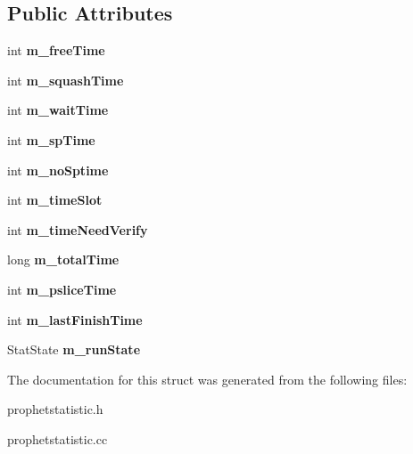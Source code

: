 \subsection*{Public Attributes}
\begin{DoxyCompactItemize}
\item 
\hypertarget{structProphetStat_1_1StatTime_ac676df9157635eaffc5bd02f654daee9}{
int {\bfseries m\_\-freeTime}}
\label{structProphetStat_1_1StatTime_ac676df9157635eaffc5bd02f654daee9}

\item 
\hypertarget{structProphetStat_1_1StatTime_aa3ec64ca05e740139b76184158169db0}{
int {\bfseries m\_\-squashTime}}
\label{structProphetStat_1_1StatTime_aa3ec64ca05e740139b76184158169db0}

\item 
\hypertarget{structProphetStat_1_1StatTime_ae7ddad00f7aaeb89b70c155a240ff2c9}{
int {\bfseries m\_\-waitTime}}
\label{structProphetStat_1_1StatTime_ae7ddad00f7aaeb89b70c155a240ff2c9}

\item 
\hypertarget{structProphetStat_1_1StatTime_a594256279592f8f1776ecb4191322657}{
int {\bfseries m\_\-spTime}}
\label{structProphetStat_1_1StatTime_a594256279592f8f1776ecb4191322657}

\item 
\hypertarget{structProphetStat_1_1StatTime_a930e8175516047464f9eb041173bd210}{
int {\bfseries m\_\-noSptime}}
\label{structProphetStat_1_1StatTime_a930e8175516047464f9eb041173bd210}

\item 
\hypertarget{structProphetStat_1_1StatTime_a645cbfe1814ac1af3a4644573998b210}{
int {\bfseries m\_\-timeSlot}}
\label{structProphetStat_1_1StatTime_a645cbfe1814ac1af3a4644573998b210}

\item 
\hypertarget{structProphetStat_1_1StatTime_ac9887a51cf8fc6875cc2e8a7c8b587ce}{
int {\bfseries m\_\-timeNeedVerify}}
\label{structProphetStat_1_1StatTime_ac9887a51cf8fc6875cc2e8a7c8b587ce}

\item 
\hypertarget{structProphetStat_1_1StatTime_a3bfe4024fcde7a64c301355abc74f400}{
long {\bfseries m\_\-totalTime}}
\label{structProphetStat_1_1StatTime_a3bfe4024fcde7a64c301355abc74f400}

\item 
\hypertarget{structProphetStat_1_1StatTime_a3fde3247b4aae233cf4af8d18b1cb0e3}{
int {\bfseries m\_\-psliceTime}}
\label{structProphetStat_1_1StatTime_a3fde3247b4aae233cf4af8d18b1cb0e3}

\item 
\hypertarget{structProphetStat_1_1StatTime_a28277280c2a3516ec0e9bb496846356d}{
int {\bfseries m\_\-lastFinishTime}}
\label{structProphetStat_1_1StatTime_a28277280c2a3516ec0e9bb496846356d}

\item 
\hypertarget{structProphetStat_1_1StatTime_a9e1958fda986447845cb2da7d9c575ea}{
StatState {\bfseries m\_\-runState}}
\label{structProphetStat_1_1StatTime_a9e1958fda986447845cb2da7d9c575ea}

\end{DoxyCompactItemize}


The documentation for this struct was generated from the following files:\begin{DoxyCompactItemize}
\item 
prophetstatistic.h\item 
prophetstatistic.cc\end{DoxyCompactItemize}
